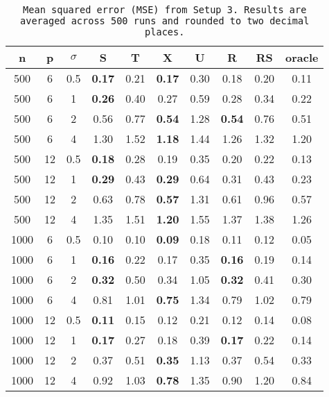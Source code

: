 \begin{table}[ht]
\centering
\begin{tabular}{cccccccccc}
  \hline
n & p & $\sigma$ & S & T & X & U & R & RS & oracle \\ 
  \hline
500 & 6 & 0.5 & \bf 0.17 & 0.21 & \bf 0.17 &  0.30 & 0.18 & 0.20 & 0.11 \\ 
  500 & 6 & 1 & \bf 0.26 & 0.40 & 0.27 &  0.59 & 0.28 & 0.34 & 0.22 \\ 
  500 & 6 & 2 & 0.56 & 0.77 & \bf 0.54 &  1.28 & \bf 0.54 & 0.76 & 0.51 \\ 
  500 & 6 & 4 & 1.30 & 1.52 & \bf 1.18 &  1.44 & 1.26 & 1.32 & 1.20 \\ 
  500 & 12 & 0.5 & \bf 0.18 & 0.28 & 0.19 &  0.35 & 0.20 & 0.22 & 0.13 \\ 
  500 & 12 & 1 & \bf 0.29 & 0.43 & \bf 0.29 &  0.64 & 0.31 & 0.43 & 0.23 \\ 
  500 & 12 & 2 & 0.63 & 0.78 & \bf 0.57 &  1.31 & 0.61 & 0.96 & 0.57 \\ 
  500 & 12 & 4 & 1.35 & 1.51 & \bf 1.20 &  1.55 & 1.37 & 1.38 & 1.26 \\ 
  1000 & 6 & 0.5 & 0.10 & 0.10 & \bf 0.09 &  0.18 & 0.11 & 0.12 & 0.05 \\ 
  1000 & 6 & 1 & \bf 0.16 & 0.22 & 0.17 &  0.35 & \bf 0.16 & 0.19 & 0.14 \\ 
  1000 & 6 & 2 & \bf 0.32 & 0.50 & 0.34 &  1.05 & \bf 0.32 & 0.41 & 0.30 \\ 
  1000 & 6 & 4 & 0.81 & 1.01 & \bf 0.75 &  1.34 & 0.79 & 1.02 & 0.79 \\ 
  1000 & 12 & 0.5 & \bf 0.11 & 0.15 & 0.12 &  0.21 & 0.12 & 0.14 & 0.08 \\ 
  1000 & 12 & 1 & \bf 0.17 & 0.27 & 0.18 &  0.39 & \bf 0.17 & 0.22 & 0.14 \\ 
  1000 & 12 & 2 & 0.37 & 0.51 & \bf 0.35 &  1.13 & 0.37 & 0.54 & 0.33 \\ 
  1000 & 12 & 4 & 0.92 & 1.03 & \bf 0.78 &  1.35 & 0.90 & 1.20 & 0.84 \\ 
   \hline
\end{tabular}
\caption{\tt Mean squared error (MSE) from Setup 3. Results are averaged across 500 runs and rounded to two decimal places.} 
\label{table:setup3}
\end{table}
